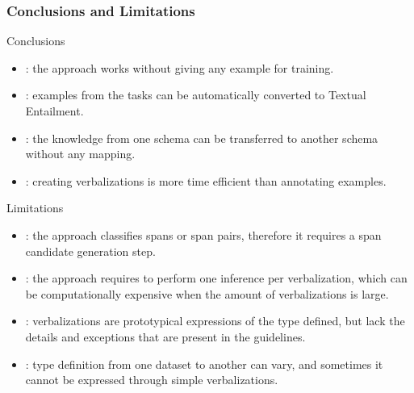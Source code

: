 \documentclass[
    11pt,
    notheorems,
    xcolor={dvipsnames},
    hyperref={
        pdfstartview=FitH, 
        pdftitle={Ikasketa-adibide urriko Informazio-Erauzketa}, 
        pdfauthor={Oscar Sainz Jimenez}, 
        citecolor=secondary, 
    }
]{beamer}
\begin{document}

\subsubsection{Conclusions and Limitations}

\begin{frame}
    \begin{block}{Conclusions}
        \begin{itemize}[<+->]
            \item {}: the approach works without giving any example for training.
            \item {}: examples from the tasks can be automatically converted to Textual Entailment.
            \item {}: the knowledge from one schema can be transferred to another schema without any mapping.
            \item {}: creating verbalizations is more time efficient than annotating examples.
        \end{itemize}
    \end{block}
\end{frame}

\begin{frame}
    \begin{block}{Limitations}
        \begin{itemize}[<+->]
            \item {}: the approach classifies spans or span pairs, therefore it requires a span candidate generation step. %
            \item {}: the approach requires to perform one inference per verbalization, which can be computationally expensive when the amount of verbalizations is large.
            \item {}: verbalizations are prototypical expressions of the type defined, but lack the details and exceptions that are present in the guidelines.
            \item {}: type definition from one dataset to another can vary, and sometimes it cannot be expressed through simple verbalizations.
        \end{itemize}
    \end{block}
\end{frame}
\end{document}
